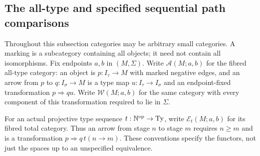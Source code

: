 \subsection{The all-type and specified sequential path comparisons}
Throughout this subsection categories may be arbitrary small categories.
A marking is a subcategory containing all objects; it need not contain
all isomorphisms. Fix endpoints $a,b$ in $(M,\Sigma)$. Write
$\mathcal A(M;a,b)$ for the fibred all-type category: an object is
$p:I_\tau\to M$ with marked negative edges, and an arrow from $p$ to
$q:I_\sigma\to M$ is a type map $u:I_\tau\to I_\sigma$ and an
endpoint-fixed transformation $p\Rightarrow qu$. Write
$\mathcal W(M;a,b)$ for the same category with every component of this
transformation required to lie in $\Sigma$.

For an actual projective type sequence $t:\mathbb N^{\mathrm {op}}\to\mathrm{Ty}$,
write $\mathcal E_t(M;a,b)$ for its fibred total category. Thus an
arrow from stage $n$ to stage $m$ requires $n\geq m$ and is a
transformation $p\Rightarrow q\,t(n\to m)$. These conventions specify
the functors, not just the spaces up to an unspecified equivalence.

